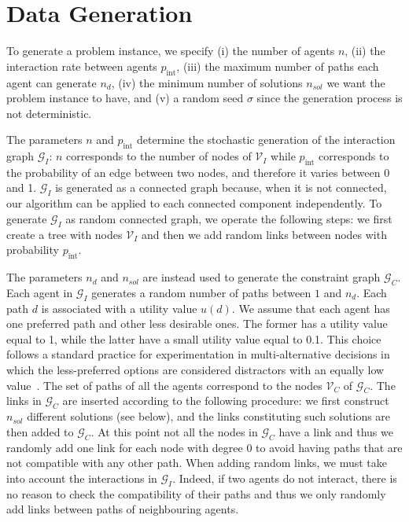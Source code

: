 \section{Data Generation}\label{sec:data_gen}

To generate a problem instance, we specify (i) the number of agents $n$, (ii) the interaction rate between agents $p_{\operatorname{int}}$, (iii) the maximum number of paths each agent can generate $n_d$, (iv) the minimum number of solutions $n_{sol}$ we want the problem instance to have, and (v) a random seed $\sigma$ since the generation process is not deterministic.

The parameters $n$ and $p_{\operatorname{int}}$ determine the stochastic generation of the interaction graph $\mathcal{G}_I$: $n$ corresponds to the number of nodes of $\mathcal{V}_I$ while $p_{\operatorname{int}}$ corresponds to the probability of an edge between two nodes, and therefore it varies between 0 and 1. $\mathcal{G}_I$ is generated as a connected graph because, when it is not connected, our algorithm can be applied to each connected component independently. To generate $\mathcal{G}_I$ as random connected graph, we operate the following steps: we first create a tree with nodes $\mathcal{V}_I$ and then we add random links between nodes with probability $p_{\operatorname{int}}$.

The parameters $n_d$ and $n_{sol}$ are instead used to generate the constraint graph $\mathcal{G}_C$. Each agent in $\mathcal{G}_I$ generates a random number of paths between $1$ and $n_d$. Each path $d$ is associated with a utility value $u(d)$. We assume that each agent has one preferred path and other less desirable ones. The former has a utility value equal to 1, while the latter have a small utility value equal to 0.1. This choice follows a standard practice for experimentation in multi-alternative decisions in which the less-preferred options are considered distractors with an equally low value~\cite{Reina:2017jl}.
The set of paths of all the agents correspond to the nodes $\mathcal{V}_C$ of $\mathcal{G}_C$.
The links in $\mathcal{G}_C$ are inserted according to the following procedure: we first construct $n_{sol}$ different solutions (see below), and the links constituting such solutions are then added to $\mathcal{G}_C$. At this point not all the nodes in $\mathcal{G}_C$ have a link and thus we randomly add one link for each node with degree $0$ to avoid having paths that are not compatible with any other path. When adding random links, we must take into account the interactions in $\mathcal{G}_I$. Indeed, if two agents do not interact, there is no reason to check the compatibility of their paths and thus we only randomly add links between paths of neighbouring agents.

